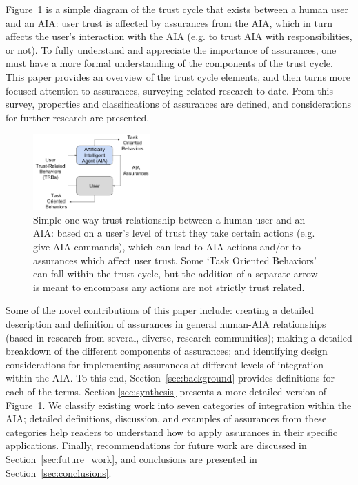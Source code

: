 Figure~\ref{fig:SimpleTrust_one_way} is a simple diagram of the trust cycle that exists between a human user and an AIA: user trust is affected by assurances from the AIA, which in turn affects the user's interaction with the AIA (e.g. to trust AIA with responsibilities, or not). To fully understand and appreciate the importance of assurances, one must have a more formal understanding of the components of the trust cycle. This paper provides an overview of the trust cycle elements, and then turns more focused attention to assurances, surveying related research to date. From this survey, properties and classifications of assurances are defined, and considerations for further research are presented. 
%
\begin{figure}
    \centering
    \includegraphics[width=0.4\textwidth]{Figures/SimpleTrust_one_way}
    \caption{Simple one-way trust relationship between a human user and an AIA: based on a user's level of trust they take certain actions (e.g. give AIA commands), which can lead to AIA actions and/or to assurances which affect user trust. Some `Task Oriented Behaviors' can fall within the trust cycle, but the addition of a separate arrow is meant to encompass any actions are not strictly trust related.}
    \label{fig:SimpleTrust_one_way}
    \vspace{-0.25 in}
\end{figure}
%
Some of the novel contributions of this paper include: creating a detailed description and definition of assurances in general human-AIA relationships (based in research from several, diverse, research communities); making a detailed breakdown of the different components of assurances; and identifying design considerations for implementing assurances at different levels of integration within the AIA. To this end, Section~\ref{sec:background} provides definitions for each of the terms. Section \ref{sec:synthesis} presents a more detailed version of Figure~\ref{fig:SimpleTrust_one_way}. We classify existing work into seven categories of integration within the AIA; detailed definitions, discussion, and examples of assurances from these categories help readers to understand how to apply assurances in their specific applications. Finally, recommendations for future work are discussed in Section~\ref{sec:future_work}, and conclusions are presented in Section~\ref{sec:conclusions}.
